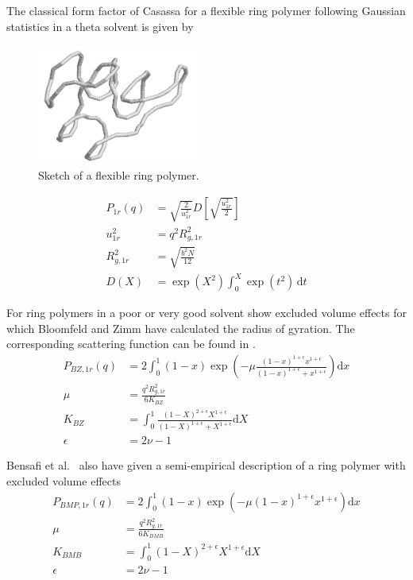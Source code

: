 The classical form factor of Casassa for a flexible ring polymer following Gaussian statistics in a theta solvent is given by
\begin{figure}[htb]
\begin{center}
\includegraphics[width=0.471\textwidth,height=0.353\textwidth]{flexibleRing.png}
\end{center}
\caption{Sketch of a flexible ring polymer.}
\label{fig:flexibleRing}
\end{figure}

\begin{align}\label{eq:rinpolymerCasassa}
P_{1r}(q) & = \sqrt{\frac{2}{u_{1r}^2}} D\left[ \sqrt{\frac{u_{1r}^2}{2}} \right] \\
u_{1r}^2 &= q^2R^2_{g,1r} \\
R^2_{g,1r} &= \sqrt{\frac{b^2N}{12}} \\
D(X) &= \exp\left(X^2\right) \int_0^X \exp(t^2)\, \mathrm{d}t
\end{align}

For ring polymers in a poor or very good solvent show excluded volume effects for which Bloomfeld and Zimm \cite{Bloomfield1966,Bensafi2000,Goosen2015} have calculated the radius of gyration. The corresponding scattering function can be found in \cite{Bensafi2000}.
\begin{align}\label{eq:rinpolymerBZ}
  P_{BZ,1r}(q) &= 2   \int_{0}^{1}(1-x)\exp\left(-\mu\frac{(1-x)^{1+\epsilon}x^{1+\epsilon}}{(1-x)^{1+\epsilon}+x^{1+\epsilon}}\right)\mathrm{d}x \\
  \mu &= \frac{q^2 R^2_{g,1r}}{6 K_{BZ}} \\
  K_{BZ} &= \int_0^1 \frac{(1-X)^{2+\epsilon}X^{1+\epsilon}}{(1-X)^{1+\epsilon}+X^{1+\epsilon}}\mathrm{d}X \\
  \epsilon &= 2\nu-1
\end{align}


Bensafi et al.\  \cite{Bensafi2000} also have given a semi-empirical description of a ring polymer with excluded volume effects
\begin{align}\label{eq:rinpolymerBMB}
  P_{BMP,1r}(q) &= 2 \int_{0}^{1}(1-x)\exp\left(-\mu (1-x)^{1+\epsilon}x^{1+\epsilon}\right)\mathrm{d}x \\
  \mu &= \frac{q^2 R^2_{g,1r}}{6 K_{BMB}} \\
  K_{BMB} &= \int_0^1 (1-X)^{2+\epsilon}X^{1+\epsilon} \mathrm{d}X \\
  \epsilon &= 2\nu-1
\end{align}

